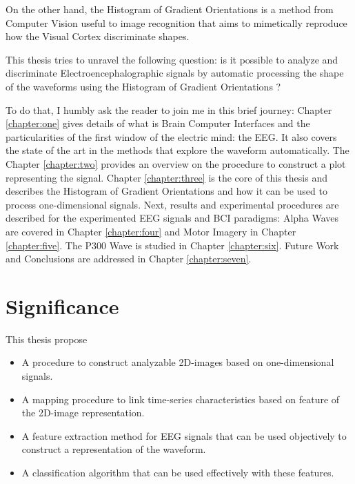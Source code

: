 
On the other hand, the Histogram of Gradient Orientations is a method from Computer Vision useful to image recognition that aims to mimetically reproduce how the Visual Cortex discriminate shapes.

This thesis tries to unravel the following question:  is it possible to analyze and discriminate Electroencephalographic signals by automatic processing the shape of the waveforms using the Histogram of Gradient Orientations ?

To do that, I humbly ask the reader to join me in this brief journey:  Chapter  \ref{chapter:one} gives details of what is Brain Computer Interfaces and the particularities of the first window of the electric mind: the EEG. It also covers the state of the art in the methods that explore the waveform automatically.  The Chapter \ref{chapter:two} provides an overview on the procedure to construct a plot representing the signal. Chapter \ref{chapter:three} is the core of this thesis and describes the Histogram of Gradient Orientations and how it can be used to process one-dimensional signals.
Next, results and experimental procedures are described for the experimented EEG signals and  BCI paradigms:  Alpha Waves are covered in Chapter \ref{chapter:four} and Motor Imagery in Chapter \ref{chapter:five}. The P300 Wave is studied in Chapter \ref{chapter:six}.  Future Work and Conclusions are addressed in Chapter \ref{chapter:seven}.  


\section{Significance}

This thesis propose

\begin{itemize}
\item A procedure to construct analyzable 2D-images based on one-dimensional signals.
\item A mapping procedure to link time-series characteristics based on feature of the 2D-image representation.
\item A feature extraction method for EEG signals that can be used objectively to construct a representation of the waveform.
\item A classification algorithm that can be used effectively with these features.
\end{itemize}

